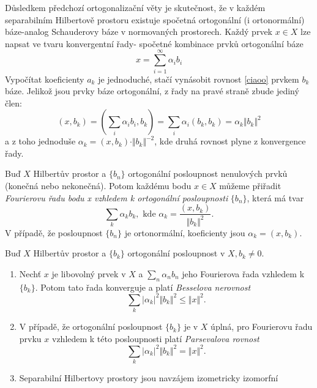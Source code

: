 \begin{dusledek}
	Důsledkem předchozí ortogonalizační věty je skutečnost, že v každém separabilním Hilbertově prostoru existuje spočetná ortogonální (i ortonormální) báze-analog Schauderovy báze v normovaných prostorech. Každý prvek $x\in X$ lze napsat ve tvaru konvergentní řady- spočetné kombinace prvků ortogonální báze
	\begin{equation}
	\label{ciaoo}
		x=\sum_{i=1}^{\infty} \alpha_i b_i
	\end{equation}
	Vypočítat koeficienty $a_k$ je jednoduché, stačí vynásobit rovnost \eqref{ciaoo} prvkem $b_k$ báze. Jelikož jsou prvky báze ortogonální, z řady na pravé straně zbude jediný člen:
	\begin{equation}
		(x,b_k)=(\sum_i \alpha_i b_i, b_k)=\sum_i \alpha_i (b_k,b_k)=\alpha_k\Vert b_k\Vert^2
	\end{equation}
	a z toho jednoduše $\alpha_k=(x,b_k)\cdot \Vert b_k\Vert^{-2} $, kde druhá rovnost plyne z konvergence řady.
\end{dusledek}

\begin{definition}
	Buď $X$ Hilbertův prostor a $\{b_n\}$ ortogonální posloupnost nenulových prvků (konečná nebo nekonečná). Potom každému bodu $x\in X$ můžeme přiřadit \textit{Fourierovu řadu bodu x vzhledem k ortogonální posloupnosti }$\{b_n\}$, která má tvar
	\begin{equation}
		\sum_k\alpha_k b_k, \text{  kde      } \alpha_k=\frac{(x,b_k)}{\Vert b_k\Vert^2}.
	\end{equation}
	V případě, že posloupnost $\{b_n\}$ je ortonormální, koeficienty jsou $\alpha_k=(x,b_k).$
\end{definition}

\begin{theorem}
	Buď $X$ Hilbertův prostor a $\{b_k\}$ ortogonální posloupnost v $X, b_k\neq 0$.
	\begin{enumerate}
		\item Nechť $x$ je libovolný prvek v $X$ a $\sum_n \alpha_nb_n$ jeho Fourierova řada vzhledem k $\{b_k \}$. Potom tato řada konverguje a platí \textit{Besselova nerovnost} \begin{equation*}
			\sum_k|\alpha_k|^2\Vert b_k\Vert^2 \leq \Vert x \Vert ^2.
		\end{equation*}
		
		\item V případě, že ortogonální posloupnost $\{b_k\}$ je v $X$ úplná, pro Fourierovu řadu prvku $x$ vzhledem k této  posloupnosti platí \textit{Parsevalova rovnost} \begin{equation*}
			\sum_k|\alpha_k|^2\Vert b_k\Vert^2 = \Vert x \Vert ^2.
		\end{equation*}
		\item Separabilní Hilbertovy prostory jsou navzájem izometricky izomorfní
	\end{enumerate}
\end{theorem}

